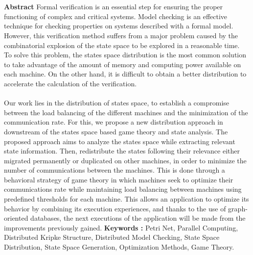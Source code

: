 \chapter*{}
\begin{changemargin}{3mm}{0cm}
	\begin{minipage}[c]{0.96\columnwidth} 
		{\LARGE\textbf{Abstract}}
		\vskip1mm
		\begingroup
		Formal verification is an essential step for ensuring the proper functioning of complex and critical systems. Model checking is an effective technique for checking properties on systems described with a formal model. However, this verification method suffers from a major problem caused by the combinatorial explosion of the state space to be explored in a reasonable time.
		\\
		
		To solve this problem, the states space distribution is the most common solution to take advantage of the amount of memory and computing power available on each machine. On the other hand, it is difficult to obtain a better distribution to accelerate the calculation of the verification.
		\\\\
		Our work lies in the distribution of states space, to establish a compromise between the load balancing of the different machines and the minimization of the communication rate. For this, we propose a new distribution approach in downstream of the states space based game theory and state analysis. The proposed approach aims to analyze the states space while extracting relevant state information. Then, redistribute the states following their relevance either migrated permanently or duplicated on other machines, in order to minimize the number of communications between the machines. This is done through a behavioral strategy of game theory in which machines seek to optimize their communications rate while maintaining load balancing between machines using predefined thresholds for each machine. This allows an application to optimize its behavior by combining its execution experiences, and thanks to the use of graph-oriented databases, the next executions of the application will be made from the improvements previously gained.		
		\endgroup
		\vskip1mm
		{\textbf{Keywords : }
			\begingroup			
			Petri Net, Parallel Computing, Distributed Kripke Structure, Distributed Model Checking, State Space Distribution,	State Space Generation, Optimization Methods, Game Theory.
			\endgroup
		}
    \end{minipage}    
\end{changemargin}